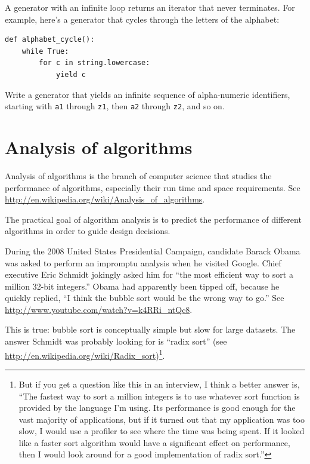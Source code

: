 \documentclass[10pt]{book}
\begin{document}
A generator with an infinite loop returns an iterator that
never terminates.  For example, here's a generator that
cycles through the letters of the alphabet:

\begin{verbatim}
def alphabet_cycle():
    while True:
        for c in string.lowercase:
            yield c
\end{verbatim}


\begin{exercise}

Write a generator that yields an infinite sequence of alpha-numeric
identifiers, starting with {\tt a1} through {\tt z1}, then {\tt a2}
through {\tt z2}, and so on.

\end{exercise}


\chapter{Analysis of algorithms}

Analysis of algorithms is the branch of computer science that studies
the performance of algorithms, especially their run time and space
requirements.  See \url{http://en.wikipedia.org/wiki/Analysis_of_algorithms}.


The practical goal of algorithm analysis is to predict the performance
of different algorithms in order to guide design decisions.

During the 2008 United States Presidential Campaign, candidate
Barack Obama was asked to perform an impromptu analysis when
he visited Google.  Chief executive Eric Schmidt jokingly asked him
for ``the most efficient way to sort a million 32-bit integers.''
Obama had apparently been tipped off, because he quickly
replied, ``I think the bubble sort would be the wrong way to go.''
See \url{http://www.youtube.com/watch?v=k4RRi_ntQc8}.

This is true: bubble sort is conceptually simple but slow for
large datasets.  The answer Schmidt was probably looking for is
``radix sort'' (see \url{http://en.wikipedia.org/wiki/Radix_sort})\footnote{
But if you get a question like this in an interview, I think
a better answer is, ``The fastest way to sort a million integers
is to use whatever sort function is provided by the language
I'm using.  Its performance is good enough for the vast majority
of applications, but if it turned out that my application was too
slow, I would use a profiler to see where the time was being
spent.  If it looked like a faster sort algorithm would have
a significant effect on performance, then I would look
around for a good implementation of radix sort.''}.
\end{document}
